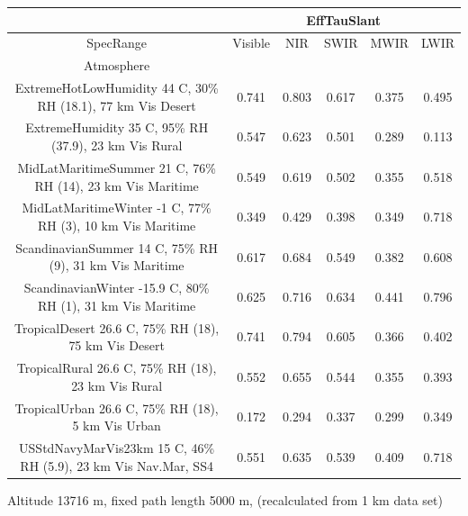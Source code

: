 \documentclass{workpackage}
\begin{document}
\begin{center}

\begin{footnotesize}

\begin{tabular}{|c|c|c|c|c|c|}
\hline
&\multicolumn{5}{|c|}{EffTauSlant}\\\hline
SpecRange&Visible&NIR&SWIR&MWIR&LWIR\\\hline
Atmosphere&&&&&\\\hline
ExtremeHotLowHumidity 44 C, 30\% RH (18.1), 77 km Vis Desert&0.741&0.803&0.617&0.375&0.495\\\hline
ExtremeHumidity 35 C, 95\% RH (37.9), 23 km Vis Rural&0.547&0.623&0.501&0.289&0.113\\\hline
MidLatMaritimeSummer 21 C, 76\% RH (14), 23 km Vis Maritime&0.549&0.619&0.502&0.355&0.518\\\hline
MidLatMaritimeWinter -1 C, 77\% RH (3), 10 km Vis Maritime&0.349&0.429&0.398&0.349&0.718\\\hline
ScandinavianSummer 14 C, 75\% RH (9), 31 km Vis Maritime&0.617&0.684&0.549&0.382&0.608\\\hline
ScandinavianWinter -15.9 C, 80\% RH (1), 31 km Vis Maritime&0.625&0.716&0.634&0.441&0.796\\\hline
TropicalDesert 26.6 C, 75\% RH (18), 75 km Vis Desert&0.741&0.794&0.605&0.366&0.402\\\hline
TropicalRural 26.6 C, 75\% RH (18), 23 km Vis Rural&0.552&0.655&0.544&0.355&0.393\\\hline
TropicalUrban 26.6 C, 75\% RH (18), 5 km Vis Urban&0.172&0.294&0.337&0.299&0.349\\\hline
USStdNavyMarVis23km 15 C, 46\% RH (5.9), 23 km Vis Nav.Mar, SS4&0.551&0.635&0.539&0.409&0.718\\\hline

\end{tabular}
\end{footnotesize}
\end{center}

Altitude 13716 m, fixed path length 5000 m, (recalculated from 1 km data set)
\end{document}
